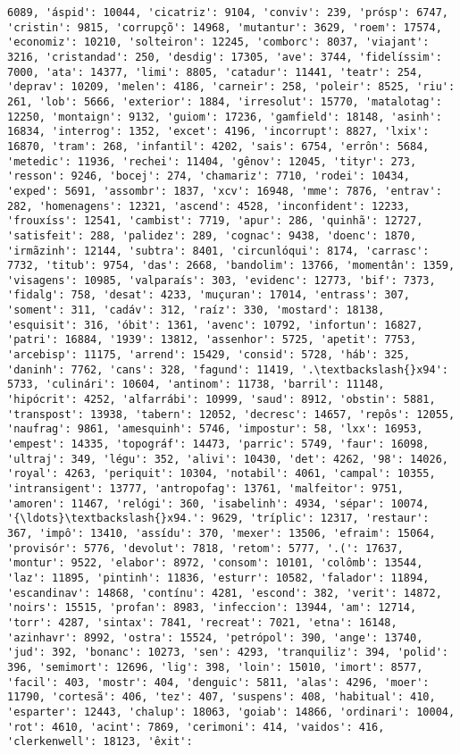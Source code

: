 \begin{Verbatim}[commandchars=\\\{\}]
6089, 'áspid': 10044, 'cicatriz': 9104, 'conviv': 239, 'prósp': 6747, 'cristin': 9815, 'corrupçõ': 14968, 'mutantur': 3629, 'roem': 17574, 'economiz': 10210, 'solteiron': 12245, 'comborc': 8037, 'viajant': 3216, 'cristandad': 250, 'desdig': 17305, 'ave': 3744, 'fidelíssim': 7000, 'ata': 14377, 'limi': 8805, 'catadur': 11441, 'teatr': 254, 'deprav': 10209, 'melen': 4186, 'carneir': 258, 'poleir': 8525, 'riu': 261, 'lob': 5666, 'exterior': 1884, 'irresolut': 15770, 'matalotag': 12250, 'montaign': 9132, 'guiom': 17236, 'gamfield': 18148, 'asinh': 16834, 'interrog': 1352, 'excet': 4196, 'incorrupt': 8827, 'lxix': 16870, 'tram': 268, 'infantil': 4202, 'sais': 6754, 'errôn': 5684, 'metedic': 11936, 'rechei': 11404, 'gênov': 12045, 'tityr': 273, 'resson': 9246, 'bocej': 274, 'chamariz': 7710, 'rodei': 10434, 'exped': 5691, 'assombr': 1837, 'xcv': 16948, 'mme': 7876, 'entrav': 282, 'homenagens': 12321, 'ascend': 4528, 'inconfident': 12233, 'frouxíss': 12541, 'cambist': 7719, 'apur': 286, 'quinhã': 12727, 'satisfeit': 288, 'palidez': 289, 'cognac': 9438, 'doenc': 1870, 'irmãzinh': 12144, 'subtra': 8401, 'circunlóqui': 8174, 'carrasc': 7732, 'titub': 9754, 'das': 2668, 'bandolim': 13766, 'momentân': 1359, 'visagens': 10985, 'valparaís': 303, 'evidenc': 12773, 'bif': 7373, 'fidalg': 758, 'desat': 4233, 'muçuran': 17014, 'entrass': 307, 'soment': 311, 'cadáv': 312, 'raíz': 330, 'mostard': 18138, 'esquisit': 316, 'óbit': 1361, 'avenc': 10792, 'infortun': 16827, 'patri': 16884, '1939': 13812, 'assenhor': 5725, 'apetit': 7753, 'arcebisp': 11175, 'arrend': 15429, 'consid': 5728, 'háb': 325, 'daninh': 7762, 'cans': 328, 'fagund': 11419, '.\textbackslash{}x94': 5733, 'culinári': 10604, 'antinom': 11738, 'barril': 11148, 'hipócrit': 4252, 'alfarrábi': 10999, 'saud': 8912, 'obstin': 5881, 'transpost': 13938, 'tabern': 12052, 'decresc': 14657, 'repôs': 12055, 'naufrag': 9861, 'amesquinh': 5746, 'impostur': 58, 'lxx': 16953, 'empest': 14335, 'topográf': 14473, 'parric': 5749, 'faur': 16098, 'ultraj': 349, 'légu': 352, 'alivi': 10430, 'det': 4262, '98': 14026, 'royal': 4263, 'periquit': 10304, 'notabil': 4061, 'campal': 10355, 'intransigent': 13777, 'antropofag': 13761, 'malfeitor': 9751, 'amoren': 11467, 'relógi': 360, 'isabelinh': 4934, 'sépar': 10074, '{\ldots}\textbackslash{}x94.': 9629, 'tríplic': 12317, 'restaur': 367, 'impô': 13410, 'assídu': 370, 'mexer': 13506, 'efraim': 15064, 'provisór': 5776, 'devolut': 7818, 'retom': 5777, '.(': 17637, 'montur': 9522, 'elabor': 8972, 'consom': 10101, 'colômb': 13544, 'laz': 11895, 'pintinh': 11836, 'esturr': 10582, 'falador': 11894, 'escandinav': 14868, 'contínu': 4281, 'escond': 382, 'verit': 14872, 'noirs': 15515, 'profan': 8983, 'infeccion': 13944, 'am': 12714, 'torr': 4287, 'sintax': 7841, 'recreat': 7021, 'etna': 16148, 'azinhavr': 8992, 'ostra': 15524, 'petrópol': 390, 'ange': 13740, 'jud': 392, 'bonanc': 10273, 'sen': 4293, 'tranquiliz': 394, 'polid': 396, 'semimort': 12696, 'lig': 398, 'loin': 15010, 'imort': 8577, 'facil': 403, 'mostr': 404, 'denguic': 5811, 'alas': 4296, 'moer': 11790, 'cortesã': 406, 'tez': 407, 'suspens': 408, 'habitual': 410, 'esparter': 12443, 'chalup': 18063, 'goiab': 14866, 'ordinari': 10004, 'rot': 4610, 'acint': 7869, 'cerimoni': 414, 'vaidos': 416, 'clerkenwell': 18123, 'êxit': 
\end{Verbatim}
